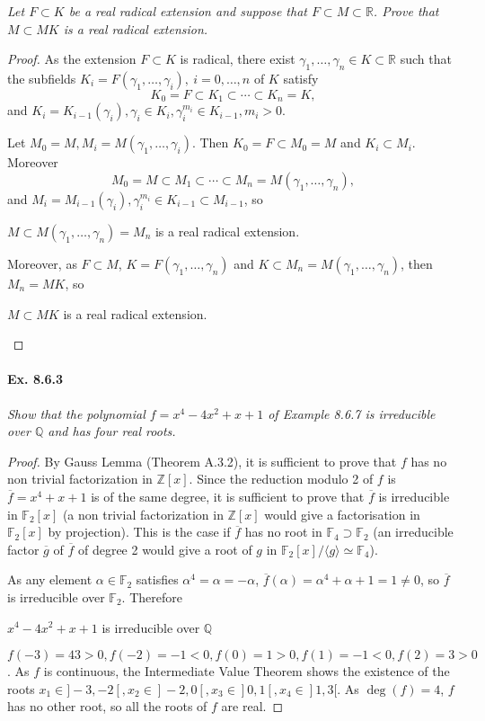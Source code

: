 \documentclass[11pt,a4paper]{article}
\newcommand{\Q}{\mathbb{Q}}
\newcommand{\Z}{\mathbb{Z}}
\newcommand{\R}{\mathbb{R}}
\newcommand{\F}{\mathbb{F}}
\begin{document}
{\it Let $F\subset K$ be a real radical extension and suppose that $F \subset M \subset \R$. Prove that $M\subset MK$ is a real radical extension.
}

\begin{proof}
As the extension $F\subset K$ is radical, there exist  $\gamma_1, \ldots,\gamma_n \in K\subset \R$ such that the subfields  $K_i = F(\gamma_1,\ldots,\gamma_i),\ i=0,\ldots,n$ of $K$ satisfy
$$K_0 = F \subset K_1 \subset \cdots \subset K_n = K,$$
and $K_i = K_{i-1}(\gamma_i), \gamma_i \in K_i, \gamma_i^{m_i} \in K_{i-1}, m_i>0$.

Let $M_0 = M, M_i = M(\gamma_1,\ldots, \gamma_i)$. Then $K_0=F  \subset M_0 = M$ and $K_i \subset M_i$. Moreover
$$M_0 = M \subset M_1\subset\cdots\subset M_n = M(\gamma_1,\ldots,\gamma_n),$$
and $M_i = M_{i-1}(\gamma_i), \gamma_i^{m_i} \in K_{i-1} \subset M_{i-1}$, so 
\begin{center}
$M \subset M(\gamma_1,\ldots,\gamma_n) = M_n$ is a real radical extension.
\end{center}
Moreover, as $F \subset M$, $K = F(\gamma_1,\ldots,\gamma_n)$ and $K \subset M_n = M(\gamma_1,\ldots,\gamma_n)$, then $M_n = MK$, so
\begin{center}
$M \subset MK$ is a real radical extension.
\end{center}
\end{proof}

\paragraph{Ex. 8.6.3}

{\it Show that the polynomial $f = x^4 -4x^2 +x + 1$ of Example 8.6.7 is irreducible over $\Q$ and has four real roots.
}

\begin{proof}
By Gauss Lemma (Theorem A.3.2), it is sufficient to prove that $f$ has no non trivial factorization in $\Z[x]$. Since the reduction modulo 2 of $f$ is $\overline{f} = x^4 +x+1$ is of the same degree, it is sufficient to prove that $\overline{f}$ is irreducible in $\F_2[x]$ (a non trivial factorization in $\Z[x]$ would give a factorisation in $\F_2[x]$ by projection). This is the case if $\overline{f}$ has no root in  $\F_4 \supset \F_2$ (an irreducible factor  $\overline{g}$ of $\overline{f}$ of degree 2 would give a root of $g$ in $\F_2[x]/\langle g \rangle \simeq \F_4$).

As any element $\alpha \in \F_2$ satisfies $\alpha^4 = \alpha = -\alpha$, $\overline{f}(\alpha) = \alpha^4+\alpha +1 = 1 \ne 0$, so $\overline{f}$ is irreducible over $\F_2$.
Therefore
\begin{center}
 $x^4 -4x^2 +x + 1$ is irreducible over $\Q$
\end{center}

\bigskip

$f(-3) = 43>0, f(-2) = -1<0,f(0) = 1>0, f(1) = -1<0, f(2) = 3>0$. As $f$ is continuous, the Intermediate Value Theorem shows the existence of the roots $x_1 \in ]-3,-2[, x_2 \in ]-2,0[, x_3 \in ]0,1[, x_4 \in ]1,3[$. As $\deg(f) = 4$, $f$ has no other root, so all the roots of $f$ are real.
\end{proof}
\end{document}
